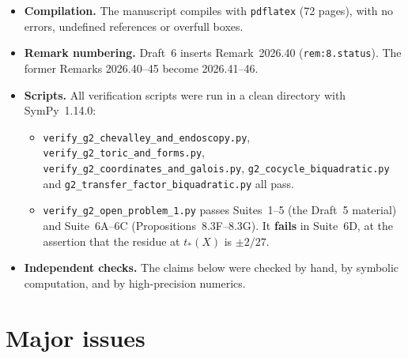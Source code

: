 \documentclass[12pt,letterpaper]{article}
\begin{document}
\begin{itemize}[leftmargin=1.5em]
\item \textbf{Compilation.} The manuscript compiles with \texttt{pdflatex}
(72 pages), with no errors, undefined references or overfull boxes.
\item \textbf{Remark numbering.} Draft~6 inserts Remark~2026.40
(\texttt{rem:8.status}). The former Remarks 2026.40--45 become 2026.41--46.
\item \textbf{Scripts.} All verification scripts were run in a clean directory
with SymPy~1.14.0:
\begin{itemize}[leftmargin=1.5em]
\item \texttt{verify\_g2\_chevalley\_and\_endoscopy.py},
\texttt{verify\_g2\_toric\_and\_forms.py},
\texttt{verify\_g2\_coordinates\_and\_galois.py},
\texttt{g2\_cocycle\_biquadratic.py} and
\texttt{g2\_transfer\_factor\_biquadratic.py} all pass.
\item \texttt{verify\_g2\_open\_problem\_1.py} passes Suites~1--5 (the Draft~5
material) and Suite~6A--6C (Propositions~8.3F--8.3G). It \textbf{fails} in
Suite~6D, at the assertion that the residue at $t_*(X)$ is $\pm 2/27$.
\end{itemize}
\item \textbf{Independent checks.} The claims below were checked by hand, by
symbolic computation, and by high-precision numerics.
\end{itemize}

\section*{Major issues}
\end{document}
